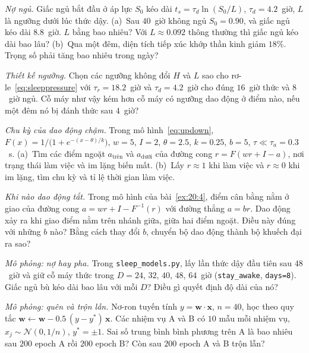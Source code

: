 \begin{exercise}[\lvlA]
\label{ex:20:2}
\emph{Nợ ngủ.} Giấc ngủ bắt đầu ở áp lực $S_0$ kéo dài $t_s=\tau_d\ln(S_0/L)$, $\tau_d=4.2$~giờ, $L$ là ngưỡng dưới lúc thức dậy. (a)~Sau $40$~giờ không ngủ $S_0=0.90$, và giấc ngủ kéo dài $8.8$~giờ. $L$ bằng bao nhiêu? Với $L\approx0.092$ thông thường thì giấc ngủ kéo dài bao lâu? (b)~Qua một đêm, diện tích tiếp xúc khớp thần kinh giảm $18\%$. Trọng số phải tăng bao nhiêu trong ngày?
\end{exercise}

\begin{exercise}[\lvlB]
\label{ex:20:3}
\emph{Thiết kế ngưỡng.} Chọn các ngưỡng không đổi $H$ và $L$ sao cho rơ-le~\eqref{eq:sleeppressure} với $\tau_r=18.2$~giờ và $\tau_d=4.2$~giờ cho đúng $16$~giờ thức và $8$~giờ ngủ. Cỗ máy như vậy kém hơn cỗ máy có ngưỡng dao động ở điểm nào, nếu một đêm nó bị đánh thức sau $4$~giờ?
\end{exercise}

\begin{exercise}[\lvlB]
\label{ex:20:4}
\emph{Chu kỳ của dao động chậm.} Trong mô hình~\eqref{eq:updown}, $F(x)=1/\bigl(1+e^{-(x-\theta)/k}\bigr)$, $w=5$, $I=2$, $\theta=2.5$, $k=0.25$, $b=5$, $\tau\ll\tau_a=0.3$~s. (a)~Tìm các điểm ngoặt $a_{\text{trên}}$ và $a_{\text{dưới}}$ của đường cong $r=F(wr+I-a)$, nơi trạng thái làm việc và im lặng biến mất. (b)~Lấy $r\approx1$ khi làm việc và $r\approx0$ khi im lặng, tìm chu kỳ và tỉ lệ thời gian làm việc.
\end{exercise}

\begin{exercise}[\lvlB]
\label{ex:20:5}
\emph{Khi nào dao động tắt.} Trong mô hình của bài~\ref{ex:20:4}, điểm cân bằng nằm ở giao của đường cong $a=wr+I-F^{-1}(r)$ với đường thẳng $a=br$. Dao động xảy ra khi giao điểm nằm trên nhánh giữa, giữa hai điểm ngoặt. Điều này đúng với những $b$ nào? Bằng cách thay đổi $b$,  chuyển bộ dao động thành bộ khuếch đại ra sao?
\end{exercise}

\begin{exercise}[\lvlB]
\label{ex:20:6}
\emph{Mô phỏng: nợ hay pha.} Trong \texttt{sleep\_models.py}, lấy lần thức dậy đầu tiên sau $48$~giờ và giữ cỗ máy thức trong $D=24$, $32$, $40$, $48$, $64$~giờ (\texttt{stay\_awake}, \texttt{days=8}). Giấc ngủ bù kéo dài bao lâu với mỗi $D$? Điều gì quyết định độ dài của nó?
\end{exercise}

\begin{exercise}[\lvlB]
\label{ex:20:7}
\emph{Mô phỏng: quên và trộn lẫn.} Nơ-ron tuyến tính $y=\mathbf w\cdot\mathbf x$, $n=40$, học theo quy tắc $\mathbf w\leftarrow\mathbf w-0.5\,(y-y^*)\,\mathbf x$. Các nhiệm vụ A và B có $10$ mẫu mỗi nhiệm vụ, $x_j\sim\mathcal N(0,1/n)$, $y^*=\pm1$. Sai số trung bình bình phương trên A là bao nhiêu sau $200$ epoch A rồi $200$ epoch B? Còn sau $200$ epoch A và B trộn lẫn?
\end{exercise}

